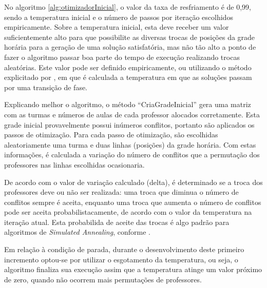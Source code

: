 No algoritmo \ref{alg:otimizadorInicial}, o valor da taxa de resfriamento é de 0,99, sendo a temperatura inicial e o número de passos por iteração escolhidos empiricamente. Sobre a temperatura inicial, esta deve receber um valor suficientemente alto para que possibilite as diversas trocas de posições da grade horária para a geração de uma solução satisfatória, mas não tão alto a ponto de fazer o algoritmo passar boa parte do tempo de execução realizando trocas aleatórias. Este valor 
pode ser definido empiricamente, ou utilizando o método explicitado por , em que é calculada a temperatura em que as soluções passam por uma transição de fase.

Explicando melhor o algoritmo, o método ``CriaGradeInicial''  gera uma matriz com as turmas e números de aulas de cada professor alocados corretamente. Esta grade inicial provavelmente possui inúmeros conflitos, portanto são aplicados os passos de otimização. Para cada passo de otimização, são escolhidas aleatoriamente uma turma e duas linhas (posições) da grade horária. Com estas informações, é calculada a variação do número de conflitos que a permutação dos professores nas linhas escolhidas ocasionaria. 

De acordo com o valor de variação calculado (delta), é determinado se a troca dos professores deve ou não ser realizada: uma troca que diminua o número de conflitos sempre é aceita, enquanto uma troca que aumenta o número de conflitos pode ser aceita probabilistacamente, de acordo com o valor da temperatura na iteração atual. Esta probabilida de aceite das trocas é algo padrão para algoritmos de \textit{Simulated Annealing}, conforme .

Em relação à condição de parada, durante o desenvolvimento deste primeiro incremento optou-se por utilizar o esgotamento da temperatura, ou seja, o algoritmo finaliza sua execução assim que a temperatura atinge um valor próximo de zero, quando não ocorrem mais permutações de professores.


